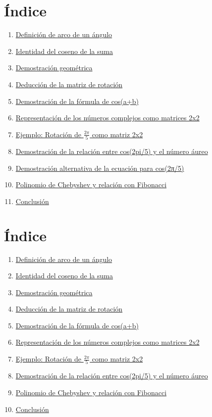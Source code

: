 \documentcla\section*{Índice}
\begin{enumerate}
  \item \hyperref[sec:arco]{Definición de arco de un ángulo}
  \item \hyperref[sec:identidad]{Identidad del coseno de la suma}
  \item \hyperref[sec:geom]{Demostración geométrica}
  \item \hyperref[sec:rotacion]{Deducción de la matriz de rotación}
  \item \hyperref[sec:demcos]{Demostración de la fórmula de cos(a+b)}
  \item \hyperref[sec:complejos]{Representación de los números complejos como matrices 2x2}
  \item \hyperref[sec:ejemplo]{Ejemplo: Rotación de $\frac{2\pi}{5}$ como matriz 2x2}
  \item \hyperref[sec:cosenoaureo]{Demostración de la relación entre cos(2pi/5) y el número áureo}
  \item \hyperref[sec:demostracion_alternativa]{Demostración alternativa de la ecuación para cos(2π/5)}
  \item \hyperref[sec:chebfib]{Polinomio de Chebyshev y relación con Fibonacci}
  \item \hyperref[sec:conclusion]{Conclusión}
\end{enumerate}\usepackage{amsmath}
\usepackage{hyperref}
\usepackage{tikz}
\usepackage{amssymb}
\usepackage{xcolor}




\section*{Índice}
\begin{enumerate}
  \item \hyperref[sec:arco]{Definición de arco de un ángulo}
  \item \hyperref[sec:identidad]{Identidad del coseno de la suma}
  \item \hyperref[sec:geom]{Demostración geométrica}
  \item \hyperref[sec:rotacion]{Deducción de la matriz de rotación}
  \item \hyperref[sec:demcos]{Demostración de la fórmula de cos(a+b)}
  \item \hyperref[sec:complejos]{Representación de los números complejos como matrices 2x2}
  \item \hyperref[sec:ejemplo]{Ejemplo: Rotación de $\frac{2\pi}{5}$ como matriz 2x2}
  \item \hyperref[sec:cosenoaureo]{Demostración de la relación entre cos(2pi/5) y el número áureo}
  \item \hyperref[sec:chebfib]{Polinomio de Chebyshev y relación con Fibonacci}
  \item \hyperref[sec:conclusion]{Conclusión}
\end{enumerate}

